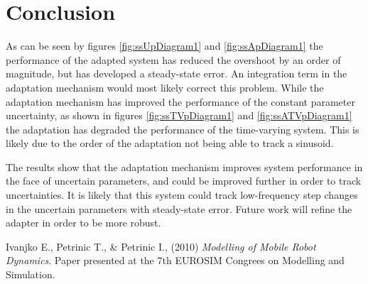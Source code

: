 \documentclass[letterpaper,12pt]{report}
\begin{document}
\chapter{Conclusion}
As can be seen by figures \ref{fig:ssUpDiagram1} and \ref{fig:ssApDiagram1} the performance of the adapted system has reduced the overshoot by an order
of magnitude, but has developed a steady-state error. An integration term in the adaptation mechanism would most likely correct this problem.
While the adaptation mechanism has improved the performance of the constant parameter uncertainty, as shown in figures \ref{fig:ssTVpDiagram1} and
\ref{fig:ssATVpDiagram1} the adaptation has degraded the performance of the time-varying system. This is likely due to the order of the adaptation not being
able to track a sinusoid.

The results show that the adaptation mechanism improves system performance in the face of uncertain parameters, and could be improved further in order
to track uncertainties. It is likely that this system could track low-frequency step changes in the uncertain parameters with steady-state error. 
Future work will refine the adapter in order to be more robust.


\begin{thebibliography}{9}

  Ivanjko E., Petrinic T., \& Petrinic I.,
  (2010)
  \emph{Modelling of Mobile Robot Dynamics}.
  Paper presented at the 7th EUROSIM Congrees on Modelling and Simulation. 

\end{thebibliography}
\end{document}
